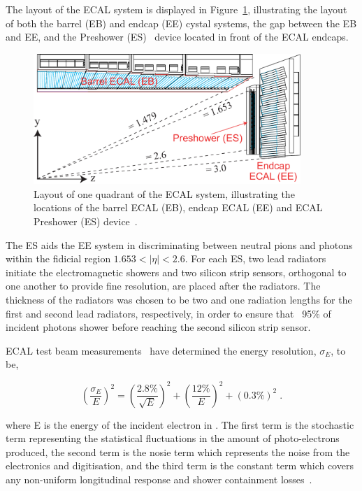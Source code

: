The layout of the ECAL system is displayed in Figure~\ref{fig:ecal}, illustrating the layout of both the barrel (EB) and endcap (EE) cystal systems, the gap between the EB and EE, and the Preshower (ES)~\cite{Loos:539819} device located in front of the ECAL endcaps.

\begin{figure}[htb]
\begin{center}
\includegraphics[width=0.9\textwidth]{figs/cms/ECAL_Transverse_section.pdf}
\caption{Layout of one quadrant of the ECAL system, illustrating the locations of the barrel ECAL (EB), endcap ECAL (EE) and ECAL Preshower (ES) device~\cite{Bayatian:2006nff}.}
\label{fig:ecal}
\end{center}
\end{figure}

The ES aids the EE system in discriminating between neutral pions and photons within the fidicial region $1.653 < |\eta| < 2.6$.
For each ES, two lead radiators initiate the electromagnetic showers and two silicon strip sensors, orthogonal to one another to provide fine resolution, are placed after the radiators.
The thickness of the radiators was chosen to be two and one radiation lengths for the first and second lead radiators, respectively, in order to ensure that ~95\% of incident photons shower before reaching the second silicon strip sensor.

ECAL test beam measurements~\cite{Adzic:2007mi} have determined the energy resolution, $\sigma_{E}$, to be,

\begin{equation}
(\frac{\sigma_{E}}{E})^{2} = (\frac{2.8\%}{\sqrt{E}})^{2} + (\frac{12\%}{E})^{2} + (0.3\%)^{2} \;.
\label{eq:ecalResolution}
\end{equation}

where E is the energy of the incident electron in \GeV. 
The first term is the stochastic term representing the statistical fluctuations in the amount of photo-electrons produced, the second term is the nosie term which represents the noise from the electronics and digitisation, and the third term is the constant term which covers any non-uniform longitudinal response and shower containment losses~\cite{Adzic:2007mi}.

